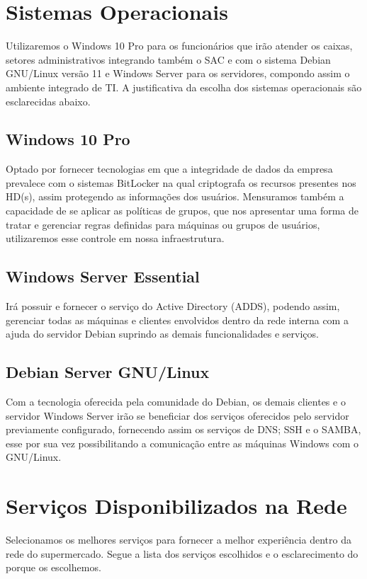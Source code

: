 \documentclass[12pt]{article}
\begin{document}
\section{Sistemas Operacionais}
Utilizaremos o Windows 10 Pro para os funcionários que irão atender os caixas, setores administrativos integrando também o SAC e com o sistema Debian GNU/Linux versão 11 e Windows Server para os servidores, compondo assim o ambiente integrado de TI. A justificativa da escolha dos sistemas operacionais são esclarecidas abaixo.

\subsection{Windows 10 Pro}
Optado por fornecer tecnologias em que a integridade de dados da empresa prevalece com o sistemas BitLocker na qual criptografa os recursos presentes nos HD(s), assim protegendo as informações dos usuários. Mensuramos também a capacidade de se aplicar as políticas de grupos, que nos apresentar uma forma de tratar e gerenciar regras definidas para máquinas ou grupos de usuários, utilizaremos esse controle em nossa infraestrutura.

\subsection{Windows Server Essential}
Irá possuir e fornecer o serviço do Active Directory (ADDS), podendo assim, gerenciar todas as máquinas e clientes envolvidos dentro da rede interna com a ajuda do servidor Debian suprindo as demais funcionalidades e serviços.

\subsection{Debian Server GNU/Linux}
Com a tecnologia oferecida pela comunidade do Debian, os demais clientes e o servidor Windows Server irão se beneficiar dos serviços oferecidos pelo servidor previamente configurado, fornecendo assim os serviços de DNS; SSH e o SAMBA, esse por sua vez possibilitando a comunicação entre as máquinas Windows com o GNU/Linux.

\section{Serviços Disponibilizados na Rede}
Selecionamos os melhores serviços para fornecer a melhor experiência dentro da rede do supermercado. Segue a lista dos serviços escolhidos e o esclarecimento do porque os escolhemos.
\end{document}
